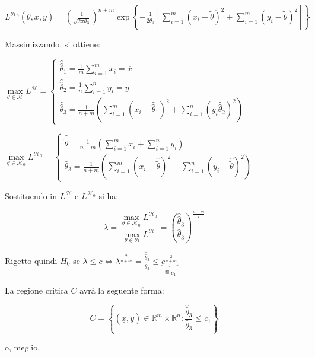 \documentclass[hidelinks, 10pt]{report}
\begin{document}
$ L^{\mathcal{H}_{0}} (\underline{\theta}, \underline{x}, \underline{y}) = \left( \frac{1}{\sqrt{2 \pi \theta_{3}}} \right)^{n + m} \exp \left\{ - \frac{1}{2 \theta_{3}} \left[ \sum\limits_{i = 1}^{m} (x_{i} - \tilde{\theta})^{2} + \sum\limits_{i = 1}^{m} (y_{i} - \tilde{\theta})^{2} \right] \right\} $

Massimizzando, si ottiene:

$ \max\limits_{\underline{\theta} \in \mathcal{H}} L^{\mathcal{H}} = \begin{cases} \hat{\hat{\theta}}_{1} = \frac{1}{m} \sum\limits_{i = 1}^{m} x_{i} = \overline{x} \\ \hat{\hat{\theta}}_{2} = \frac{1}{n} \sum\limits_{i = 1}^{n} y_{i} = \overline{y} \\ \hat{\hat{\theta}}_{3} = \frac{1}{n + m} \left( \sum\limits_{i = 1}^{m} (x_{i} - \hat{\hat{\theta}}_{1})^{2} + \sum\limits_{i = 1}^{n} (y_{i}  \hat{\hat{\theta}}_{2})^{2} \right) \end{cases} $

$ \max\limits_{\underline{\theta} \in \mathcal{H}_{0}} L^{\mathcal{H}_{0}} = \begin{cases} \hat{\tilde{\theta}} = \frac{1}{n + m} \left( \sum\limits_{i = 1}^{m} x_{i} + \sum\limits_{i = 1}^{n} y_{i} \right) \\ \hat{\theta}_{3} = \frac{1}{n + m} \left( \sum\limits_{i = 1}^{m} (x_{i} - \hat{\tilde{\theta}})^{2} + \sum\limits_{i = 1}^{n} (y_{i} - \hat{\tilde{\theta}})^{2} \right) \end{cases} $

Sostituendo in $ L^{\mathcal{H}} $ e $ L^{\mathcal{H}_{0}} $ si ha:

\[ \lambda = \frac{\max\limits_{\theta \in \mathcal{H}_{0}} L^{\mathcal{H}_{0}}}{\max\limits_{\theta \in \mathcal{H}} L^{\mathcal{H}}} = \left( \frac{\hat{\hat{\theta}}_{3}}{\hat{\theta}_{3}} \right)^{\frac{n + m}{2}} \]

Rigetto quindi $ H_{0} $ se $ \lambda \le c \iff \lambda^{\frac{2}{n + m}} = \frac{\hat{\hat{\theta}}_{3}}{\hat{\theta}_{3}} \le \underbrace{c^{\frac{2}{n + m}}}_{\eqdef c_{1}} $


La regione critica $ C $ avr\`a la seguente forma:

\[
C = \left\{ (\underline{x}, \underline{y}) \in \mathbb{R}^{m} \times \mathbb{R}^{n} : \frac{\hat{\hat{\theta}}_{3}}{\hat{\theta}_{3}} \le c_{1} \right\}
\]

o, meglio,
\end{document}
